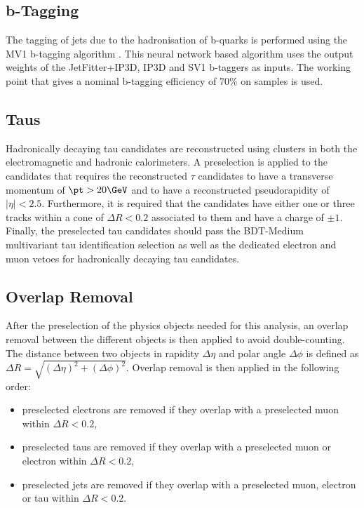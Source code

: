 \subsection{b-Tagging}
\label{sec:presel:btag}

The tagging of jets due to the hadronisation of b-quarks is performed
using the MV1 b-tagging algorithm \cite{mv1}. This neural network based
algorithm uses the output weights of the JetFitter+IP3D, IP3D and
SV1 b-taggers as inputs. The working point that gives a nominal
b-tagging efficiency of 70\% on \ttbar samples is used.

\subsection{Taus}
\label{sec:presel:tau}

Hadronically decaying tau candidates are reconstructed using clusters
in both the electromagnetic and hadronic calorimeters. A preselection
is applied to the candidates that requires the reconstructed $\tau$
candidates to have a transverse momentum of $\pt>20 \GeV$ and to have
a reconstructed pseudorapidity of $|\eta| < 2.5$. Furthermore, it is
required that the candidates have either one or three tracks within a
cone of $\Delta R < 0.2$ associated to them and have a charge of $\pm
1$. Finally, the preselected tau candidates should pass the BDT-Medium
multivariant tau identification selection as well as the dedicated
electron and muon vetoes for hadronically decaying tau candidates.


\subsection{Overlap Removal}
\label{sec:presel:olr}

After the preselection of the physics objects needed for this
analysis, an overlap removal between the different objects is then
applied to avoid double-counting.  The distance between two objects in
rapidity $\Delta\eta$ and polar angle $\Delta\phi$ is defined as
$\Delta R=\sqrt{(\Delta\eta)^2+(\Delta\phi)^2}$. Overlap removal is
then applied in the following order:

\begin{itemize}
\item preselected electrons are removed if they overlap with a preselected muon  within $\Delta R < 0.2$,
\item preselected taus are removed if they overlap with a preselected muon or electron within $\Delta R < 0.2$,
\item preselected jets are removed  if they overlap with a preselected
  muon, electron or tau within \linebreak $\Delta R<0.2$.
\end{itemize}

